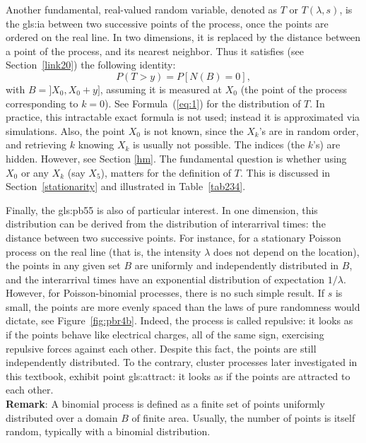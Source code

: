 \documentclass[10pt]{article}
\begin{document}
Another fundamental, real-valued random variable, denoted as $T$ or $T(\lambda,s)$,  is the 
\gls{gls:ia} %
between two successive points of the process, once the points are ordered on the real line. In two dimensions, it is replaced by the distance between a point of the process, and its nearest neighbor. Thus it satisfies (see Section~\ref{link20}) the following identity:
$$P(T>y)=P[N(B)=0], $$
with $B = ]X_0, X_0+y]$, assuming it is measured at $X_0$ (the point of the process corresponding to $k=0$). See Formula~(\ref{eq:1}) for the distribution of $T$. In practice, this intractable exact formula is not used; instead it is approximated via simulations. Also, the point $X_0$ is not known, since the $X_k$'s are in random order, and retrieving $k$ knowing $X_k$ is usually not possible.  The indices (the $k$'s) are hidden. However, see Section \ref{hm}. The fundamental question is whether using $X_0$ or any $X_k$ (say $X_5$), matters for the definition of $T$. This is discussed in Section~\ref{stationarity}
and illustrated in Table~\ref{tab234}.




Finally, the 
\gls{gls:pb55}  %
is also of particular interest. In one dimension, this distribution can be derived from the distribution of interarrival times: the distance between two successive points. For instance, for a stationary  Poisson process on the real line (that is, the intensity $\lambda$ does not depend on the location), the points in any given set $B$ are uniformly and independently distributed in $B$, and the interarrival times have an exponential distribution of expectation $1/\lambda$. However, for Poisson-binomial processes, there is no such simple result. If $s$ is small, the points are more evenly spaced than the laws of pure randomness would dictate, see Figure~\ref{fig:pbr4b}. Indeed, the process is called \textcolor{index}{repulsive}: it looks as if the points behave like electrical charges, all of the same sign, exercising repulsive forces against each other. Despite this fact, the points are still independently distributed. To the contrary, cluster processes later investigated in this textbook, exhibit point \gls{gls:attract}: it looks as if the points are attracted to each other. \vspace{1ex} \\
{\bf Remark}: A \textcolor{index}{binomial process} is defined as a finite set of points uniformly distributed over a domain $B$ of finite area. Usually, the number of points is itself random, typically with a \textcolor{index}{binomial distribution}.
\end{document}
